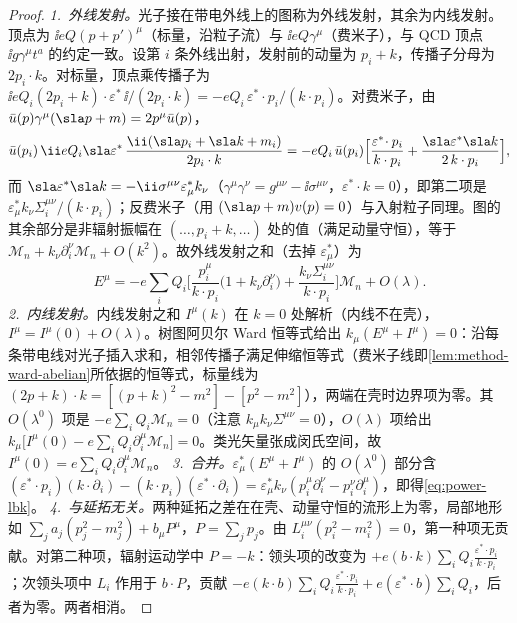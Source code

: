 \begin{proof}
\emph{1.~外线发射。}光子接在带电外线上的图称为外线发射，其余为内线发射。顶点为 $\ii eQ(p+p')^\mu$（标量，沿粒子流）与 $\ii eQ\gamma^\mu$（费米子），与 QCD 顶点 $\ii g\gamma^\mu t^a$ 的约定一致。设第 $i$ 条外线出射，发射前的动量为 $p_i+k$，传播子分母为 $2p_i\cdot k$。对标量，顶点乘传播子为 $\ii eQ_i(2p_i+k)\cdot\varepsilon^*\,\ii/(2p_i\cdot k)=-eQ_i\,\varepsilon^*\!\cdot p_i/(k\cdot p_i)$。对费米子，由 $\bar u(p)\gamma^\mu(\sla p+m)=2p^\mu\bar u(p)$，
\begin{equation*}
\bar u(p_i)\,\ii eQ_i\sla\varepsilon^*\,\frac{\ii(\sla p_i+\sla k+m_i)}{2p_i\cdot k}=-eQ_i\,\bar u(p_i)\Big[\frac{\varepsilon^*\!\cdot p_i}{k\cdot p_i}+\frac{\sla\varepsilon^*\sla k}{2\,k\cdot p_i}\Big],
\end{equation*}
而 $\sla\varepsilon^*\sla k=-\ii\sigma^{\mu\nu}\varepsilon^*_\mu k_\nu$（$\gamma^\mu\gamma^\nu=g^{\mu\nu}-\ii\sigma^{\mu\nu}$，$\varepsilon^*\!\cdot k=0$），即第二项是 $\varepsilon^*_\mu k_\nu\Sigma_i^{\mu\nu}/(k\cdot p_i)$；反费米子（用 $(\sla p+m)v(p)=0$）与入射粒子同理。图的其余部分是非辐射振幅在 $(\dots,p_i+k,\dots)$ 处的值（满足动量守恒），等于 $\mathcal M_n+k_\nu\partial_i^\nu\mathcal M_n+O(k^2)$。故外线发射之和（去掉 $\varepsilon^*_\mu$）为
\begin{equation}\label{eq:power-lbk-ext}
E^\mu=-e\sum_iQ_i\Big[\frac{p_i^\mu}{k\cdot p_i}\big(1+k_\nu\partial_i^\nu\big)+\frac{k_\nu\Sigma_i^{\mu\nu}}{k\cdot p_i}\Big]\mathcal M_n+O(\lambda).
\end{equation}
\emph{2.~内线发射。}内线发射之和 $I^\mu(k)$ 在 $k=0$ 处解析（内线不在壳），$I^\mu=I^\mu(0)+O(\lambda)$。树图阿贝尔 Ward 恒等式给出 $k_\mu(E^\mu+I^\mu)=0$：沿每条带电线对光子插入求和，相邻传播子满足伸缩恒等式（费米子线即\cref{lem:method-ward-abelian}所依据的恒等式，标量线为 $(2p+k)\cdot k=[(p+k)^2-m^2]-[p^2-m^2]$），两端在壳时边界项为零。其 $O(\lambda^0)$ 项是 $-e\sum_iQ_i\mathcal M_n=0$（注意 $k_\mu k_\nu\Sigma^{\mu\nu}=0$），$O(\lambda)$ 项给出 $k_\mu\big[I^\mu(0)-e\sum_iQ_i\partial_i^\mu\mathcal M_n\big]=0$。类光矢量张成闵氏空间，故 $I^\mu(0)=e\sum_iQ_i\partial_i^\mu\mathcal M_n$。
\emph{3.~合并。}$\varepsilon^*_\mu(E^\mu+I^\mu)$ 的 $O(\lambda^0)$ 部分含 $(\varepsilon^*\!\cdot p_i)(k\cdot\partial_i)-(k\cdot p_i)(\varepsilon^*\!\cdot\partial_i)=\varepsilon^*_\mu k_\nu(p_i^\mu\partial_i^\nu-p_i^\nu\partial_i^\mu)$，即得\eqref{eq:power-lbk}。
\emph{4.~与延拓无关。}两种延拓之差在在壳、动量守恒的流形上为零，局部地形如 $\sum_ja_j(p_j^2-m_j^2)+b_\mu P^\mu$，$P=\sum_jp_j$。由 $L_i^{\mu\nu}(p_i^2-m_i^2)=0$，第一种项无贡献。对第二种项，辐射运动学中 $P=-k$：领头项的改变为 $+e(b\cdot k)\sum_iQ_i\frac{\varepsilon^*\cdot p_i}{k\cdot p_i}$；次领头项中 $L_i$ 作用于 $b\cdot P$，贡献 $-e(k\cdot b)\sum_iQ_i\frac{\varepsilon^*\cdot p_i}{k\cdot p_i}+e(\varepsilon^*\!\cdot b)\sum_iQ_i$，后者为零。两者相消。

\end{proof}
